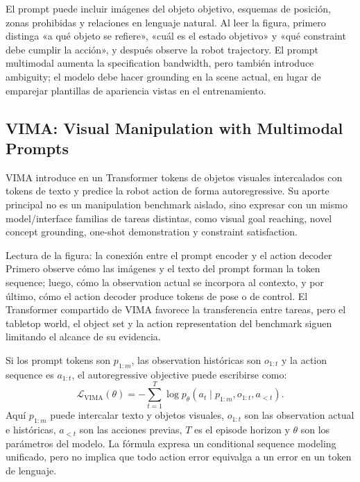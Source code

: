 El prompt puede incluir imágenes del objeto objetivo, esquemas de posición, zonas prohibidas y relaciones en lenguaje natural. Al leer la figura, primero distinga «a qué objeto se refiere», «cuál es el estado objetivo» y «qué constraint debe cumplir la acción», y después observe la robot trajectory. El prompt multimodal aumenta la specification bandwidth, pero también introduce ambiguity; el modelo debe hacer grounding en la scene actual, en lugar de emparejar plantillas de apariencia vistas en el entrenamiento.

\subsection{VIMA: Visual Manipulation with Multimodal Prompts}

VIMA introduce en un Transformer tokens de objetos visuales intercalados con tokens de texto y predice la robot action de forma autoregressive. Su aporte principal no es un manipulation benchmark aislado, sino expresar con un mismo model/interface familias de tareas distintas, como visual goal reaching, novel concept grounding, one-shot demonstration y constraint satisfaction.


\begin{knowledgebox}{Lectura de la figura: la conexión entre el prompt encoder y el action decoder}
Primero observe cómo las imágenes y el texto del prompt forman la token sequence; luego, cómo la observation actual se incorpora al contexto, y por último, cómo el action decoder produce tokens de pose o de control. El Transformer compartido de VIMA favorece la transferencia entre tareas, pero el tabletop world, el object set y la action representation del benchmark siguen limitando el alcance de su evidencia.
\end{knowledgebox}

Si los prompt tokens son $p_{1:m}$, las observation históricas son $o_{1:t}$ y la action sequence es $a_{1:t}$, el autoregressive objective puede escribirse como:
\[
\mathcal{L}_{\mathrm{VIMA}}(\theta)
=-\sum_{t=1}^{T}\log p_\theta\!\left(a_t\mid p_{1:m},o_{1:t},a_{<t}\right).
\]
Aquí $p_{1:m}$ puede intercalar texto y objetos visuales, $o_{1:t}$ son las observation actual e históricas, $a_{<t}$ son las acciones previas, $T$ es el episode horizon y $\theta$ son los parámetros del modelo. La fórmula expresa un conditional sequence modeling unificado, pero no implica que todo action error equivalga a un error en un token de lenguaje.

